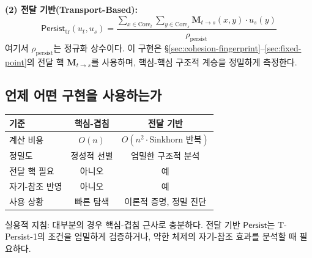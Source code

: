 \textbf{(2) 전달 기반(Transport-Based):}
\begin{equation}
    \mathsf{Persist}_{\mathrm{tr}}(u_t, u_s) = \frac{\sum_{x \in \mathrm{Core}_t} \sum_{y \in \mathrm{Core}_s} \mathbf{M}_{t \to s}(x,y) \cdot u_s(y)}{\rho_{\mathrm{persist}}}
    \label{eq:persist-transport}
\end{equation}
여기서 $\rho_{\mathrm{persist}}$는 정규화 상수이다. 이 구현은 §\ref{sec:cohesion-fingerprint}--\ref{sec:fixed-point}의 전달 핵 $\mathbf{M}_{t \to s}$를 사용하며, 핵심-핵심 구조적 계승을 정밀하게 측정한다.

\subsection{언제 어떤 구현을 사용하는가}

\begin{center}
\begin{tabular}{lcc}
\hline
\textbf{기준} & \textbf{핵심-겹침} & \textbf{전달 기반} \\
\hline
계산 비용 & $O(n)$ & $O(n^2 \cdot \text{Sinkhorn 반복})$ \\
정밀도 & 정성적 선별 & 엄밀한 구조적 분석 \\
전달 핵 필요 & 아니오 & 예 \\
자기-참조 반영 & 아니오 & 예 \\
사용 상황 & 빠른 탐색 & 이론적 증명, 정밀 진단 \\
\hline
\end{tabular}
\end{center}

실용적 지침: 대부분의 경우 핵심-겹침 근사로 충분하다. 전달 기반 $\mathsf{Persist}$는 T-Persist-1의 조건을 엄밀하게 검증하거나, 약한 체제의 자기-참조 효과를 분석할 때 필요하다.

